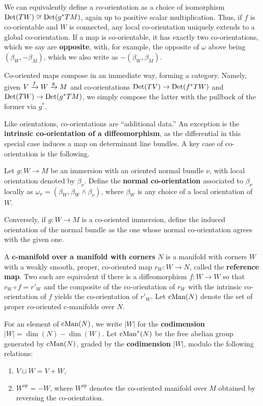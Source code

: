 We can equivalently define a co-orientation as a choice of isomorphism ${\rm Det}(TW)\cong {\rm Det}(g^*TM)$, again up to positive scalar multiplication.
Thus, if $f$ is co-orientable and $W$ is connected, any local co-orientation uniquely extends to a global co-orientation.
If a map is co-orientable, it has exactly two co-orientations, which we say are \textbf{opposite}, with, for example, the opposite of $\omega$ above being $(\beta_W, -\beta_M)$, which we also write as $-(\beta_W, \beta_M)$.

Co-oriented maps compose in an immediate way, forming a category.
Namely, given $V \xrightarrow{f} W \xrightarrow{g} M$ and co-orientations ${\rm Det}(TV) \to {\rm Det}(f^*TW)$ and ${\rm Det}(TW)\to {\rm Det}(g^*TM)$, we simply compose the latter with the pullback of the former via $g^*$.

Like orientations, co-orientations are ``additional data.''
An exception is the {\bf intrinsic co-orientation of a diffeomorphism}, as the differential
in this special case induces a map on determinant line bundles.
A key case of co-orientation is the following.

\begin{definition}\label{D: normal co-or}
	Let $g \colon W \to M$ be an immersion with an oriented normal bundle $\nu$, with local orientation denoted by $\beta_\nu$.
	Define the \textbf{normal co-orientation} associated to $\beta_\nu$ locally as $\omega_{\nu} = (\beta_W, \beta_W \wedge \beta_\nu)$, where	$\beta_W$ is any choice of a local orientation of $W$.

	Conversely, if $g \colon W \to M$ is a co-oriented immersion, define the induced orientation of the normal bundle as the one whose normal co-orientation	agrees with the given one.
\end{definition}

\begin{definition}\label{V: maps are co-oriented}
	A \textbf{c-manifold over a manifold with corners} $N$ is a
	manifold with corners $W$ with a weakly smooth, proper, co-oriented map $r_W \colon W \to N$, called the \textbf{reference map}.
	Two such are equivalent if there is a diffeomorphism $f \colon W \to W$ so that $r_W \circ f = r'_W$ and the composite of the co-orientation of $r_W$ with the intrinsic co-orientation of $f$ yields the co-orientation of $r'_W$.
	Let $\mathrm{cMan}(N)$ denote the set of proper co-oriented c-manifolds over $N$.

	For an element of $\mathrm{cMan}(N)$, we write $|W|$ for the \textbf{codimension} $|W|=\dim(N)-\dim(W)$.
	Let $\mathrm{cMan}^*(N)$ be the free abelian group generated by $\mathrm{cMan}(N)$, graded by the \textbf{codimension} $|W|$, modulo the following relations:
	\begin{enumerate}
		\item ${V \sqcup W} = V + W$,
		\item ${{W}^{op}} = -W$, where ${W}^{op}$ denotes the co-oriented manifold over $M$ obtained by reversing the co-orientation.
	\end{enumerate}
\end{definition}

